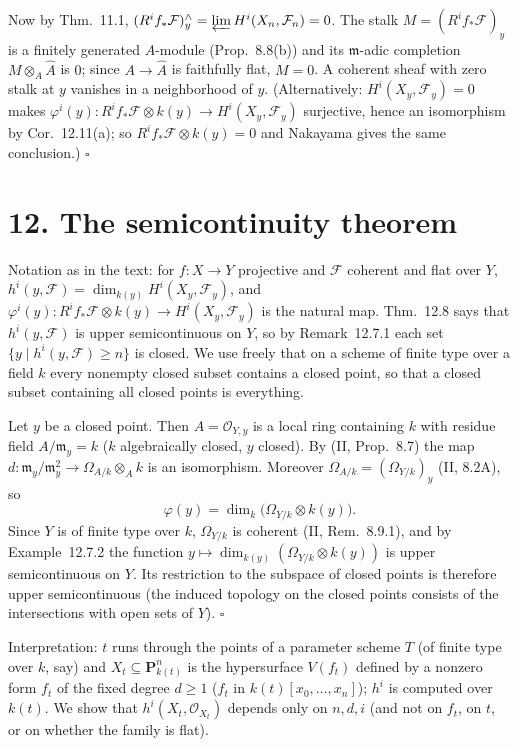 \documentclass[11pt]{article}
\begin{document}
Now by Thm.~11.1, $(R^if_*\mathcal F)^{\wedge}_y=\varprojlim H^i(X_n,\mathcal F_n)=0$. The stalk $M=(R^if_*\mathcal F)_y$ is a finitely generated $A$-module (Prop.~8.8(b)) and its $\mathfrak m$-adic completion $M\otimes_A\widehat A$ is $0$; since $A\to\widehat A$ is faithfully flat, $M=0$. A coherent sheaf with zero stalk at $y$ vanishes in a neighborhood of $y$. (Alternatively: $H^i(X_y,\mathcal F_y)=0$ makes $\varphi^i(y)\colon R^if_*\mathcal F\otimes k(y)\to H^i(X_y,\mathcal F_y)$ surjective, hence an isomorphism by Cor.~12.11(a); so $R^if_*\mathcal F\otimes k(y)=0$ and Nakayama gives the same conclusion.) \hfill$\square$

\section*{12. The semicontinuity theorem}

Notation as in the text: for $f\colon X\to Y$ projective and $\mathcal F$ coherent and flat over $Y$, $h^i(y,\mathcal F)=\dim_{k(y)}H^i(X_y,\mathcal F_y)$, and $\varphi^i(y)\colon R^if_*\mathcal F\otimes k(y)\to H^i(X_y,\mathcal F_y)$ is the natural map. Thm.~12.8 says that $h^i(y,\mathcal F)$ is upper semicontinuous on $Y$, so by Remark~12.7.1 each set $\{y\mid h^i(y,\mathcal F)\ge n\}$ is closed. We use freely that on a scheme of finite type over a field $k$ every nonempty closed subset contains a closed point, so that a closed subset containing all closed points is everything.

\pf
Let $y$ be a closed point. Then $A=\mathcal O_{Y,y}$ is a local ring containing $k$ with residue field $A/\mathfrak m_y=k$ ($k$ algebraically closed, $y$ closed). By (II, Prop.~8.7) the map $d\colon\mathfrak m_y/\mathfrak m_y^2\to\Omega_{A/k}\otimes_Ak$ is an isomorphism. Moreover $\Omega_{A/k}=(\Omega_{Y/k})_y$ (II, 8.2A), so
\[
\varphi(y)=\dim_k\big(\Omega_{Y/k}\otimes k(y)\big).
\]
Since $Y$ is of finite type over $k$, $\Omega_{Y/k}$ is coherent (II, Rem.~8.9.1), and by Example~12.7.2 the function $y\mapsto\dim_{k(y)}(\Omega_{Y/k}\otimes k(y))$ is upper semicontinuous on $Y$. Its restriction to the subspace of closed points is therefore upper semicontinuous (the induced topology on the closed points consists of the intersections with open sets of $Y$). \hfill$\square$

\pf
Interpretation: $t$ runs through the points of a parameter scheme $T$ (of finite type over $k$, say) and $X_t\subseteq\mathbf P^n_{k(t)}$ is the hypersurface $V(f_t)$ defined by a nonzero form $f_t$ of the fixed degree $d\ge1$ ($f_t$ in $k(t)[x_0,\dots,x_n]$); $h^i$ is computed over $k(t)$. We show that $h^i(X_t,\mathcal O_{X_t})$ depends only on $n,d,i$ (and not on $f_t$, on $t$, or on whether the family is flat).
\end{document}
